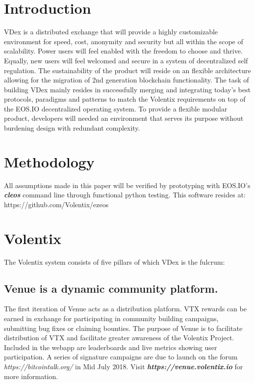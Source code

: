 \documentclass[]{article}
\begin{document}
\section{Introduction}

VDex is a distributed exchange that will provide a highly customizable environment for speed, cost, anonymity and security 
but all within the scope of scalability. 
Power users will feel enabled with the freedom to choose and thrive. 
Equally, new users will feel welcomed and secure in a system of decentralized self regulation. 
The sustainability of the product will reside on an flexible architecture allowing for the migration of 2nd generation blockchain functionality.  
The task of building VDex mainly resides in successfully merging
and integrating today's best protocols, paradigms and patterns to match the 
Volentix requirements on top of the EOS.IO decentralized operating system.
To provide a flexible modular product, developers will needed an environment that serves its purpose without burdening design with redundant complexity. 
 	
\section{Methodology}

All assumptions made in this paper will be verified by prototyping
with EOS.IO's \textbf{\textit{cleos}} command line through functional python testing. This software resides at: https://github.com/Volentix/ezeos

\section{Volentix}	
The Volentix system consists of five pillars of which VDex is the fulcrum:

\subsection {Venue is a dynamic community platform. \\}

The first iteration of Venue acts as a distribution platform. 
VTX rewards can be earned in exchange for participating in community building campaigns, submitting bug fixes or claiming bounties. 
The purpose of Venue is to facilitate distribution of VTX and facilitate greater awareness of the Volentix Project. 
Included in the webapp are leaderboards and live metrics showing user participation. 
A series of signature campaigns are due to launch on the forum \textit{https://bitcointalk.org/} in Mid July 2018. 
Visit \textbf{\textit{https://venue.volentix.io}} for more information. 
	
\end{document}
